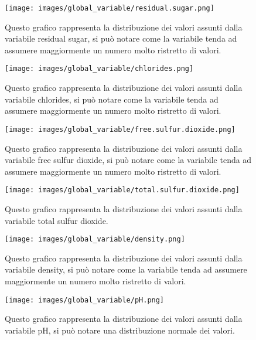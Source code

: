 \begin{figure}[H]
    \centering
    \texttt{[image: images/global\_variable/residual.sugar.png]}
    \caption{Questo grafico rappresenta la distribuzione dei valori assunti dalla variabile residual sugar, si può notare come la variabile tenda ad assumere maggiormente un numero molto ristretto di valori.}
    \label{fig:global_residual.sugar}
\end{figure}

\begin{figure}[H]
    \centering
    \texttt{[image: images/global\_variable/chlorides.png]}
    \caption{Questo grafico rappresenta la distribuzione dei valori assunti dalla variabile chlorides, si può notare come la variabile tenda ad assumere maggiormente un numero molto ristretto di valori.}
    \label{fig:global_chlorides}
\end{figure}

\begin{figure}[H]
    \centering
    \texttt{[image: images/global\_variable/free.sulfur.dioxide.png]}
    \caption{Questo grafico rappresenta la distribuzione dei valori assunti dalla variabile free sulfur dioxide, si può notare come la variabile tenda ad assumere maggiormente un numero molto ristretto di valori.}
    \label{fig:global_free.sulfur.dioxide}
\end{figure}

\begin{figure}[H]
    \centering
    \texttt{[image: images/global\_variable/total.sulfur.dioxide.png]}
    \caption{Questo grafico rappresenta la distribuzione dei valori assunti dalla variabile total sulfur dioxide.}
    \label{fig:global_total.sulfur.dioxide}
\end{figure}

\begin{figure}[H]
    \centering
    \texttt{[image: images/global\_variable/density.png]}
    \caption{Questo grafico rappresenta la distribuzione dei valori assunti dalla variabile density, si può notare come la variabile tenda ad assumere maggiormente un numero molto ristretto di valori.}
    \label{fig:global_density}
\end{figure}

\begin{figure}[H]
    \centering
    \texttt{[image: images/global\_variable/pH.png]}
    \caption{Questo grafico rappresenta la distribuzione dei valori assunti dalla variabile pH, si può notare una distribuzione normale dei valori.}
    \label{fig:global_pH}
\end{figure}

